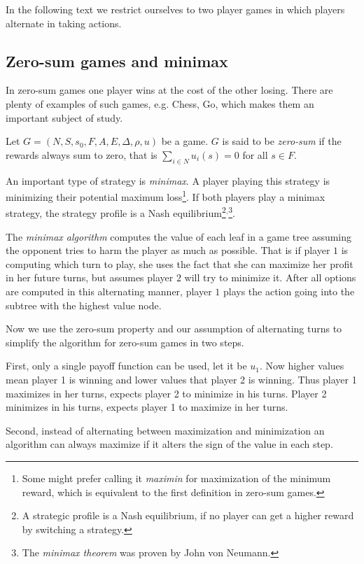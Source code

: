 In the following text
we restrict ourselves to two player games in which players alternate in
taking actions.

\subsection{Zero-sum games and minimax}

In zero-sum games one player wins at the cost of the other losing.
There are plenty of examples of such games, e.g. Chess, Go, which makes
them an important subject of study.

\begin{definition}
    Let $G = (N, S, s_0, F, A, E, \Delta, \rho, u)$ be a game.
    $G$ is said to be {\em zero-sum} if the rewards always sum to zero,
    that is $\sum_{i \in N} u_i(s) = 0$ for all $s \in F$.
\end{definition}

An important type of strategy is {\em minimax}. A player playing this
strategy is minimizing their potential maximum loss\footnote{Some might
prefer calling it {\em maximin} for maximization of the minimum reward,
which is equivalent to the first definition in zero-sum games.}. If both players play a
minimax strategy, the strategy profile is a Nash
equilibrium\footnote{
A strategic profile is a Nash equilibrium, if no player can get a higher
reward by switching a strategy.
    }$^,$\footnote{The {\em minimax theorem} was proven by John
von Neumann.}.

The {\em minimax algorithm} computes the value of each leaf in a game
tree assuming the opponent tries to harm the player as much as
possible. That is if player $1$ is computing which turn to play,
she uses the fact that she can maximize her profit in her future turns,
but assumes player $2$ will try to minimize it.
After all options are computed in this alternating manner,
player $1$ plays the action going into the subtree with the highest value node.

Now we use the zero-sum property and our assumption of alternating turns
to simplify the algorithm for zero-sum games in two steps.

First, only a single payoff function can be used,
let it be $u_1$. Now higher values mean player 1 is winning and lower
values that player 2 is winning.
Thus player 1 maximizes in her turns, expects
player 2 to minimize in his turns.
Player 2 minimizes in his turns, expects
player 1 to maximize in her turns.

Second, instead of alternating between maximization and minimization an algorithm
can always maximize if it alters the sign of the value in each step.

